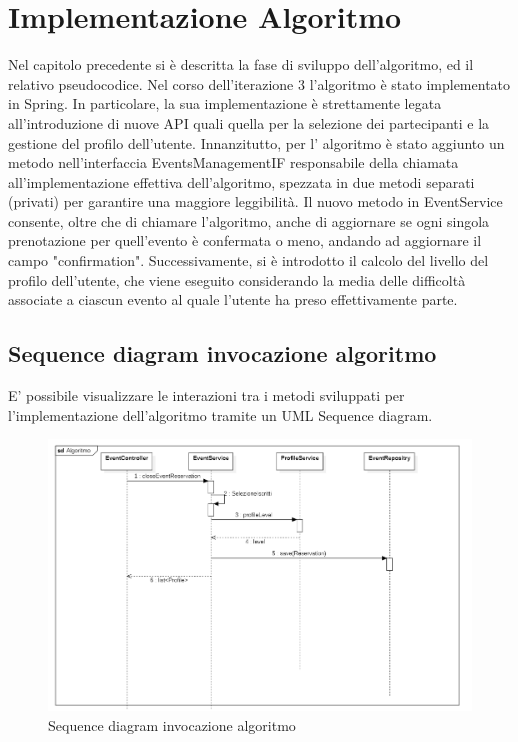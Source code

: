 \section{Implementazione Algoritmo}
Nel capitolo precedente si è descritta la fase di sviluppo dell'algoritmo, ed il relativo pseudocodice.
Nel corso dell'iterazione 3 l'algoritmo è stato implementato in Spring. In particolare, la sua implementazione è strettamente legata
all'introduzione di nuove API quali quella per la selezione dei partecipanti e la gestione del profilo dell'utente.
Innanzitutto, per l' algoritmo è stato aggiunto un metodo nell'interfaccia EventsManagementIF responsabile della chiamata all'implementazione
effettiva dell'algoritmo, spezzata in due metodi separati (privati) per garantire una maggiore leggibilità. Il nuovo metodo
in EventService consente, oltre che di chiamare l'algoritmo, anche di aggiornare se ogni singola prenotazione per quell'evento 
è confermata o meno, andando ad aggiornare il campo "confirmation".
Successivamente, si è introdotto il calcolo del livello del profilo dell'utente, che viene eseguito considerando la media delle difficoltà
associate a ciascun evento al quale l'utente ha preso effettivamente parte.
\newpage
\subsection{Sequence diagram invocazione algoritmo}
E' possibile visualizzare le interazioni tra i metodi sviluppati per l'implementazione dell'algoritmo tramite un UML Sequence diagram.
\begin{center}
\begin{figure}[h!]
    \includegraphics[width=1\textwidth]{Iterazione 3/images/sequence_diagram.png}
    \caption{Sequence diagram invocazione algoritmo}\label{fig:seq}
  \end{figure}
\end{center}
